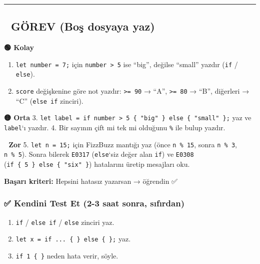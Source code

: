 \documentclass[12pt,a4paper]{article}
\begin{document}
\begin{center}\rule{0.5\linewidth}{0.5pt}\end{center}

\subsection{📝 GÖREV (Boş dosyaya yaz)}\label{görev-boş-dosyaya-yaz-5}

\textbf{🟢 Kolay}

\begin{enumerate}
\def\labelenumi{\arabic{enumi}.}
\tightlist
\item
  \texttt{let\ number\ =\ 7;} için \texttt{number\ \textgreater{}\ 5} ise ``big'', değilse ``small'' yazdır (\texttt{if} / \texttt{else}).
\item
  \texttt{score} değişkenine göre not yazdır: \texttt{\textgreater{}=\ 90} → ``A'', \texttt{\textgreater{}=\ 80} → ``B'', diğerleri → ``C'' (\texttt{else\ if} zinciri).
\end{enumerate}

\textbf{🟡 Orta}
3. \texttt{let\ label\ =\ if\ number\ \textgreater{}\ 5\ \{\ "big"\ \}\ else\ \{\ "small"\ \};} yaz ve \texttt{label}`ı yazdır.
4. Bir sayının çift mi tek mi olduğunu \texttt{\%} ile bulup yazdır.

\textbf{🔴 Zor}
5. \texttt{let\ n\ =\ 15;} için FizzBuzz mantığı yaz (önce \texttt{n\ \%\ 15}, sonra \texttt{n\ \%\ 3}, \texttt{n\ \%\ 5}). Sonra bilerek \texttt{E0317} (\texttt{else}`siz değer alan \texttt{if}) ve \texttt{E0308} (\texttt{if\ \{\ 5\ \}\ else\ \{\ "six"\ \}}) hatalarını üretip mesajları oku.

\textbf{Başarı kriteri:} Hepsini hatasız yazarsan → öğrendin ✅

\subsubsection{✅ Kendini Test Et (2-3 saat sonra, sıfırdan)}\label{kendini-test-et-2-3-saat-sonra-sıfırdan-6}

\begin{enumerate}
\def\labelenumi{\arabic{enumi}.}
\tightlist
\item
  \texttt{if} / \texttt{else\ if} / \texttt{else} zinciri yaz.
\item
  \texttt{let\ x\ =\ if\ ...\ \{\ \}\ else\ \{\ \};} yaz.
\item
  \texttt{if\ 1\ \{\ \}} neden hata verir, söyle.
\end{enumerate}
\end{document}
